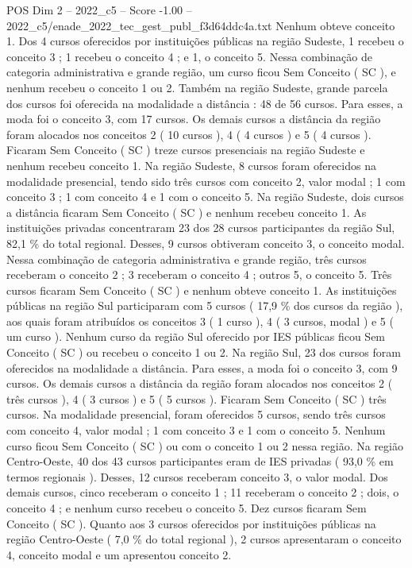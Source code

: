 \begin{textsample}{POS Dim 2 – 2022\_c5 – Score -1.00 – 2022\_c5/enade\_2022\_tec\_gest\_publ\_f3d64ddc4a.txt}
Nenhum obteve conceito 1.
Dos 4 cursos oferecidos por instituições públicas na região Sudeste, 1 recebeu o conceito 3 ; 1 recebeu o conceito 4 ; e 1, o conceito 5.
Nessa combinação de categoria administrativa e grande região, um curso ficou Sem Conceito ( SC ), e nenhum recebeu o conceito 1 ou 2.
Também na região Sudeste, grande parcela dos cursos foi oferecida na modalidade a distância : 48 de 56 cursos.
Para esses, a moda foi o conceito 3, com 17 cursos.
Os demais cursos a distância da região foram alocados nos conceitos 2 ( 10 cursos ), 4 ( 4 cursos ) e 5 ( 4 cursos ).
Ficaram Sem Conceito ( SC ) treze cursos presenciais na região Sudeste e nenhum recebeu conceito 1.
Na região Sudeste, 8 cursos foram oferecidos na modalidade presencial, tendo sido três cursos com conceito 2, valor modal ; 1 com conceito 3 ; 1 com conceito 4 e 1 com o conceito 5.
Na região Sudeste, dois cursos a distância ficaram Sem Conceito ( SC ) e nenhum recebeu conceito 1.
As instituições privadas concentraram 23 dos 28 cursos participantes da região Sul, 82,1 \% do total regional.
Desses, 9 cursos obtiveram conceito 3, o conceito modal.
Nessa combinação de categoria administrativa e grande região, três cursos receberam o conceito 2 ; 3 receberam o conceito 4 ; outros 5, o conceito 5.
Três cursos ficaram Sem Conceito ( SC ) e nenhum obteve conceito 1.
As instituições públicas na região Sul participaram com 5 cursos ( 17,9 \% dos cursos da região ), aos quais foram atribuídos os conceitos 3 ( 1 curso ), 4 ( 3 cursos, modal ) e 5 ( um curso ).
Nenhum curso da região Sul oferecido por IES públicas ficou Sem Conceito ( SC ) ou recebeu o conceito 1 ou 2.
Na região Sul, 23 dos cursos foram oferecidos na modalidade a distância.
Para esses, a moda foi o conceito 3, com 9 cursos.
Os demais cursos a distância da região foram alocados nos conceitos 2 ( três cursos ), 4 ( 3 cursos ) e 5 ( 5 cursos ).
Ficaram Sem Conceito ( SC ) três cursos.
Na modalidade presencial, foram oferecidos 5 cursos, sendo três cursos com conceito 4, valor modal ; 1 com conceito 3 e 1 com o conceito 5.
Nenhum curso ficou Sem Conceito ( SC ) ou com o conceito 1 ou 2 nessa região.
Na região Centro-Oeste, 40 dos 43 cursos participantes eram de IES privadas ( 93,0 \% em termos regionais ).
Desses, 12 cursos receberam conceito 3, o valor modal.
Dos demais cursos, cinco receberam o conceito 1 ; 11 receberam o conceito 2 ; dois, o conceito 4 ; e nenhum curso recebeu o conceito 5.
Dez cursos ficaram Sem Conceito ( SC ).
Quanto aos 3 cursos oferecidos por instituições públicas na região Centro-Oeste ( 7,0 \% do total regional ), 2 cursos apresentaram o conceito 4, conceito modal e um apresentou conceito 2.

\end{textsample}
